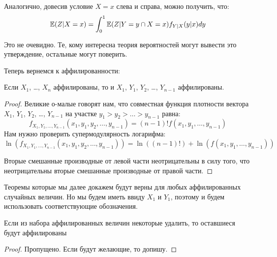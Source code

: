 Аналогично, довесив условие $ X=x $ слева и справа, можно получить, что:
\begin{equation}
\label{iterated_e}
\mathbb{E}(Z|X=x)=\int_{0}^{1}\mathbb{E}(Z|Y=y\cap X=x)f_{Y|X}(y|x)dy
\end{equation}

Это не очевидно. Те, кому интересна теория вероятностей могут вывести это утверждение, остальные могут поверить.

Теперь вернемся к аффилированности:

\begin{myth}
\label{aff_order}
Если $ X_{1} $, \ldots, $ X_{n} $ аффилированы, то и $ X_{1} $, $ Y_{1} $, $ Y_{2} $, \ldots, $ Y_{n-1} $ аффилированы.
\end{myth}

\begin{proof}
Великие о-малые говорят нам, что совместная функция плотности вектора $ X_{1} $, $ Y_{1} $, $ Y_{2} $, \ldots, $ Y_{n-1} $ на участке $ y_{1}>y_{2}>\ldots>y_{n-1} $ равна:
\begin{equation}
f_{X_{1},Y_{1},\ldots,Y_{n-1}}(x_{1},y_{1},y_{2},\ldots,y_{n-1})=(n-1)!f(x_{1},y_{1},\ldots,y_{n-1})
\end{equation}
Нам нужно проверить супермодулярность логарифма:
\begin{equation}
\ln(f_{X_{1},Y_{1},\ldots,Y_{n-1}}(x_{1},y_{1},y_{2},\ldots,y_{n-1}))=\ln((n-1)!)+\ln(f(x_{1},y_{1},\ldots,y_{n-1}))
\end{equation}

Вторые смешанные производные от левой части неотрицательны в силу того, что неотрицательны вторые смешанные производные от правой части.

\end{proof}



Теоремы которые мы далее докажем будут верны для любых аффилированных случайных величин. Но мы будем иметь ввиду $ X_{1} $ и $ Y_{1} $, поэтому и будем использовать соответствующие обозначения.

\begin{myth}
\label{aff_delete}
Если из набора аффилированных величин некоторые удалить, то оставшиеся будут аффилированы
\end{myth}

\begin{proof}
Пропущено. Если будут желающие, то допишу.

\end{proof}


